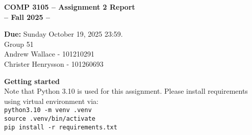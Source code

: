 \documentclass[12pt]{article}
\begin{document}
 

\begin{center} \Large\bf
COMP 3105 -- Assignment 2 Report\\
-- Fall 2025 -- 
\end{center} 

\begin{center}
{\bf Due:} Sunday October 19, 2025 23:59. \\
Group 51 \\
Andrew Wallace - 101210291\\
Christer Henrysson - 101260693\\[1em]
\end{center}
\textbf{Getting started} \\
Note that Python 3.10 is used for this assignment. Please install requirements using virtual environment via: \\
  \texttt{python3.10 -m venv .venv} \\
  \texttt{source .venv/bin/activate} \\
  \texttt{pip install -r requirements.txt}
\vspace{0.5em}
\newpage 
\end{document}
